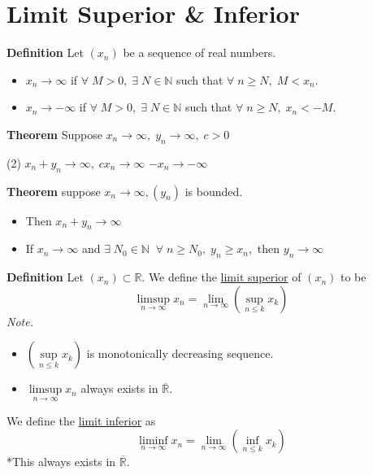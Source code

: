 \documentclass[12pt]{article}
\begin{document}
\section{Limit Superior \& Inferior}
{\bf Definition} Let $(x_n)$ be a sequence of real numbers.
\begin{itemize}
    \item $x_n\to\infty$ if $\forall\;M>0,\;\exists\;N\in\mathbb{N}$ such that $\forall\;n\ge N,\;M<x_n$.
    \item $x_n\to -\infty$ if $\forall\;M>0,\;\exists\;N\in\mathbb{N}$ such that $\forall\;n\ge N,\;x_n<-M$.\\
\end{itemize}

{\bf Theorem} Suppose $x_n\to \infty,\;y_n\to\infty,\; c>0$
\begin{tasks}(2)
\task $x_n+y_n\to \infty,\; cx_n\to\infty$
\task $-x_n\to-\infty$
\end{tasks}

\vspace{1\baselineskip}
{\bf Theorem} suppose $x_n\to \infty, (y_n)$ is bounded.
\begin{itemize}
    \item Then $x_n+y_n\to \infty$
    \item If $x_n\to\infty$ and $\exists\;N_0\in\mathbb{N}\;\;\forall\;n\ge N_0,\; y_n\ge x_n,$ then $y_n\to\infty$\\
\end{itemize}

{\bf Definition} Let $(x_n) \subset \mathbb{R}$. We define the \underline{limit superior} of $(x_n)$ to be $$\limsup\limits_{n\to\infty} x_n = \lim\limits_{n\to\infty}\left(\sup\limits_{n\le k} x_k\right)$$
{\sl Note.} 
\begin{itemize}
    \item $\left(\sup\limits_{n\le k}x_k\right)$ is monotonically decreasing sequence.
    \item $\limsup\limits_{n\to\infty} x_n$ always exists in $\overline{\mathbb{R}}$.
\end{itemize}

We define the \underline{limit inferior} as 
$$\liminf\limits_{n\to\infty} x_n = \lim\limits_{n\to\infty}\left(\inf\limits_{n\le k} x_k\right)$$
*This always exists in $\overline{\mathbb{R}}$.
\end{document}
